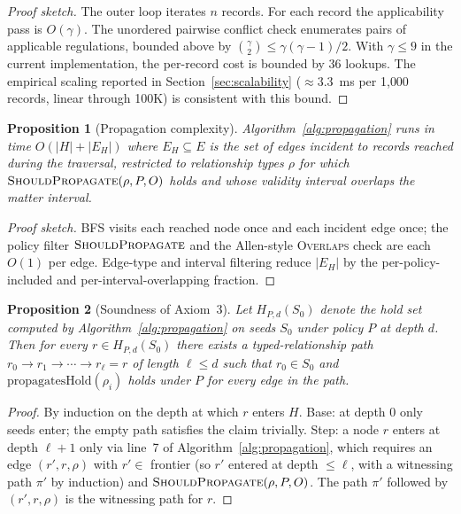 \documentclass{ieeeaccess}
\newtheorem{proposition}{Proposition}
\begin{document}
\begin{proof}[Proof sketch]
The outer loop iterates $n$ records. For each record the applicability pass is $O(\gamma)$. The unordered pairwise conflict check enumerates pairs of applicable regulations, bounded above by $\binom{\gamma}{2} \leq \gamma(\gamma-1)/2$. With $\gamma \leq 9$ in the current implementation, the per-record cost is bounded by 36 lookups. The empirical scaling reported in Section~\ref{sec:scalability} ($\approx 3.3$~ms per 1{,}000 records, linear through 100K) is consistent with this bound.
\end{proof}

\begin{proposition}[Propagation complexity]
Algorithm~\ref{alg:propagation} runs in time $O(|H| + |E_H|)$ where $E_H \subseteq E$ is the set of edges incident to records reached during the traversal, restricted to relationship types $\rho$ for which $\textsc{ShouldPropagate}(\rho, P, O)$ holds and whose validity interval overlaps the matter interval.
\end{proposition}

\begin{proof}[Proof sketch]
BFS visits each reached node once and each incident edge once; the policy filter $\textsc{ShouldPropagate}$ and the Allen-style \textsc{Overlaps} check are each $O(1)$ per edge. Edge-type and interval filtering reduce $|E_H|$ by the per-policy-included and per-interval-overlapping fraction.
\end{proof}

\begin{proposition}[Soundness of Axiom~3]
Let $H_{P,d}(S_0)$ denote the hold set computed by Algorithm~\ref{alg:propagation} on seeds $S_0$ under policy $P$ at depth $d$. Then for every $r \in H_{P,d}(S_0)$ there exists a typed-relationship path $r_0 \to r_1 \to \cdots \to r_\ell = r$ of length $\ell \leq d$ such that $r_0 \in S_0$ and $\mathrm{propagatesHold}(\rho_i)$ holds under $P$ for every edge in the path.
\end{proposition}

\begin{proof}
By induction on the depth at which $r$ enters $H$. Base: at depth 0 only seeds enter; the empty path satisfies the claim trivially. Step: a node $r$ enters at depth $\ell + 1$ only via line~7 of Algorithm~\ref{alg:propagation}, which requires an edge $(r', r, \rho)$ with $r' \in$ frontier (so $r'$ entered at depth $\leq \ell$, with a witnessing path $\pi'$ by induction) and $\textsc{ShouldPropagate}(\rho, P, O)$. The path $\pi'$ followed by $(r', r, \rho)$ is the witnessing path for $r$.
\end{proof}
\end{document}
